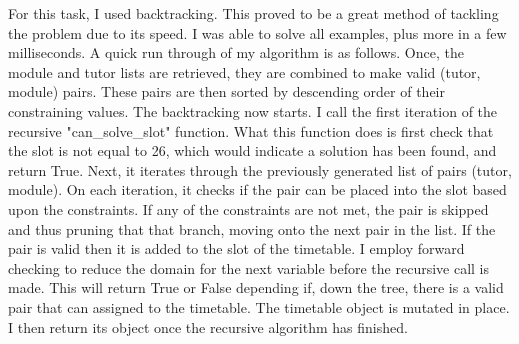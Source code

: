 \documentclass[conference]{IEEEtran}
\begin{document}
For this task, I used backtracking. This proved to be a great method of tackling the problem due to its speed. I was able to solve all examples, plus more in a few milliseconds. A quick run through of my algorithm is as follows. Once, the module and tutor lists are retrieved, they are combined to make valid (tutor, module) pairs. These pairs are then sorted by descending order of their constraining values. The backtracking now starts. I call the first iteration of the recursive "can\_solve\_slot" function. What this function does is first check that the slot is not equal to 26, which would indicate a solution has been found, and return True. Next, it iterates through the previously generated list of pairs (tutor, module). On each iteration, it checks if the pair can be placed into the slot based upon the constraints. If any of the constraints are not met, the pair is skipped and thus pruning that that branch, moving onto the next pair in the list. If the pair is valid then it is added to the slot of the timetable. I employ forward checking to reduce the domain for the next variable before the recursive call is made. This will return True or False depending if, down the tree, there is a valid pair that can assigned to the timetable. The timetable object is mutated in place. I then return its object once the recursive algorithm has finished.
\end{document}
